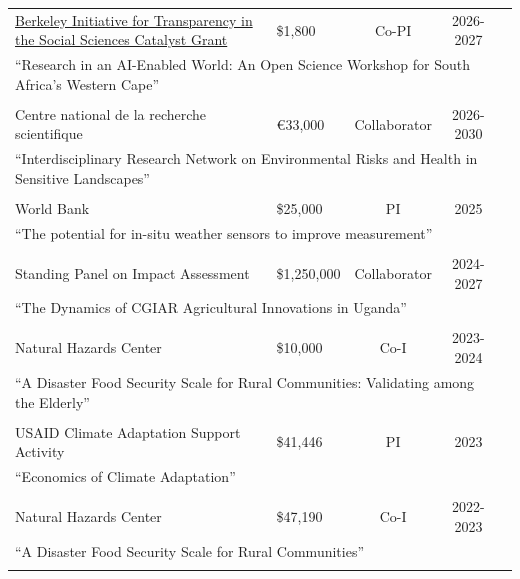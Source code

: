 \documentclass[letterpaper]{article}
\begin{document}
\begin{tabular}{llccc}

\multicolumn{1}{l}{\href{https://www.bitss.org/catalysts/announcing-new-catalyst-training-projects/}{Berkeley Initiative for Transparency in the Social Sciences Catalyst Grant}}	& \$1,800 	& Co-PI			& 2026-2027 \\
\multicolumn{4}{p{\linewidth}}{``Research in an AI-Enabled World: An Open Science Workshop for South Africa's Western Cape''} \\
&&&& \\

\multicolumn{1}{l}{Centre national de la recherche scientifique}	& €33,000 	& Collaborator			& 2026-2030 \\	
\multicolumn{4}{p{\linewidth}}{``Interdisciplinary Research Network on Environmental Risks and Health in Sensitive Landscapes''} \\
&&&& \\ 

\multicolumn{1}{l}{World Bank}	& \$25,000 	& PI			& 2025 \\	
\multicolumn{4}{p{\linewidth}}{``The potential for in-situ weather sensors to improve measurement''} \\
&&&& \\ 
		
\multicolumn{1}{l}{Standing Panel on Impact Assessment}	& \$1,250,000	& Collaborator	& 2024-2027 \\	
\multicolumn{4}{p{\linewidth}}{``The Dynamics of CGIAR Agricultural Innovations in Uganda''} \\
&&&& \\	

\multicolumn{1}{l}{Natural Hazards Center}	& \$10,000	& Co-I	& 2023-2024 \\	
\multicolumn{4}{p{\linewidth}}{``A Disaster Food Security Scale for Rural Communities: Validating among the Elderly''} \\
&&&& \\

\multicolumn{1}{l}{USAID Climate Adaptation Support Activity}	& \$41,446	& PI	& 2023 \\	
\multicolumn{4}{p{\linewidth}}{``Economics of Climate Adaptation''} \\
&&&& \\

\multicolumn{1}{l}{Natural Hazards Center}	& \$47,190 	& Co-I	& 2022-2023 \\	
\multicolumn{4}{p{\linewidth}}{``A Disaster Food Security Scale for Rural Communities''} \\
&&&& \\


\end{tabular}
\end{document}
